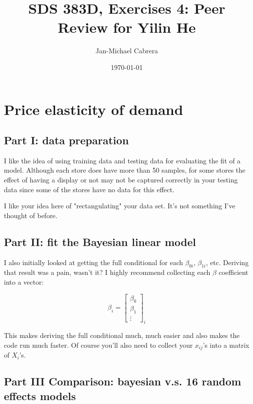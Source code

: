 \documentclass[10pt]{article}
\begin{document}
    \title{SDS 383D, Exercises 4: Peer Review for Yilin He}
    \author{Jan-Michael Cabrera}
    \date{\today}
    \maketitle

    \section*{Price elasticity of demand}

    \subsection*{Part I: data preparation}

    I like the idea of using training data and testing data for evaluating the fit of a model. Although each store does have more than 50 samples, for some stores the effect of having a display or not may not be captured correctly in your testing data since some of the stores have no data for this effect. 

    I like your idea here of "rectangulating" your data set. It's not something I've thought of before.

    \subsection*{Part II: fit the Bayesian linear model}

    I also initially looked at getting the full conditional for each $\beta_{0i}$, $\beta_{1i}$, etc. Deriving that result was a pain, wasn't it? I highly recommend collecting each $\beta$ coefficient into a vector:

    $$\beta_i = \begin{bmatrix} \beta_0 \\ \beta_1 \\ \vdots  \end{bmatrix}_i$$

    \noindent This makes deriving the full conditional much, much easier and also makes the code run much faster. Of course you'll also need to collect your $x_{ij}$'s into a matrix of $X_i$'s. 

    

    \subsection*{Part III Comparison: bayesian v.s. 16 random effects models}
\end{document}
